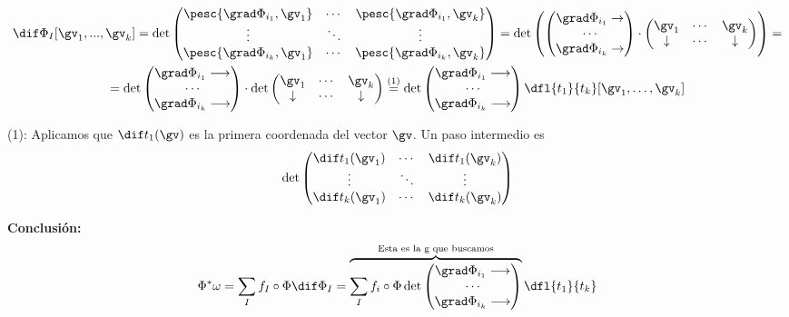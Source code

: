 \begin{gather*}
\dif \Phi_I[\gv_1,...,\gv_k] =  
\det \begin{pmatrix}
	\pesc{\grad \Phi_{i_1},\gv_1} 	& \cdots & \pesc{\grad \Phi_{i_1},\gv_k}\\
	\vdots 							& \ddots & \vdots\\
	\pesc{\grad \Phi_{i_k},\gv_1} 	& \cdots & \pesc{\grad \Phi_{i_k},\gv_k} \\
\end{pmatrix} = 
\det \left(\begin{pmatrix}
	\grad \Phi_{i_1} \rightarrow \\
	\cdots \\
	\grad \Phi_{i_k} \rightarrow 
\end{pmatrix}
\cdot 
\begin{pmatrix}
	\gv_1 		& \cdots & \gv_k\\
	\downarrow 	& \cdots & \downarrow
\end{pmatrix}\right) = \\
= \det\begin{pmatrix}
	\grad \Phi_{i_1} \longrightarrow \\
	\cdots \\
	\grad \Phi_{i_k} \longrightarrow 
\end{pmatrix} 
\cdot 
\det \begin{pmatrix}
	\gv_1 		& \cdots & \gv_k \\
	\downarrow 	& \cdots & \downarrow
\end{pmatrix} \stackrel{(1)}{=}
\det\begin{pmatrix}
	\grad \Phi_{i_1} \longrightarrow \\
	\cdots \\
	\grad \Phi_{i_k} \longrightarrow 
\end{pmatrix} \dfl{t_1}{t_k}[\gv_1,\dotsc,\gv_k]
\end{gather*}

(1): Aplicamos que $\dif t_1(\gv)$ es la primera coordenada del vector $\gv$. Un paso intermedio es \[\det \begin{pmatrix}
\dif t_1(\gv_1) & \cdots & \dif t_1(\gv_k)\\
\vdots 			& \ddots & \vdots\\
\dif t_k(\gv_1) & \cdots & \dif t_k(\gv_k)
\end{pmatrix} \]

\textbf{Conclusión:}
\[
\Phi^{\ast} \omega = \sum_I f_I\circ\Phi \dif \Phi_I =
\overbrace{\sum_I f_i\circ\Phi 
\det\begin{pmatrix}
	\grad \Phi_{i_1} \longrightarrow \\
	\cdots \\
	\grad \Phi_{i_k} \longrightarrow 
\end{pmatrix}}^{\text{Esta es la g que buscamos}} \dfl{t_1}{t_k}
\]

